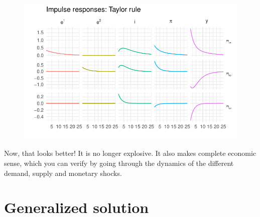 \documentclass[
  letterpaper,
]{book}
\begin{document}
\begin{figure}[H]

{\centering \includegraphics{BK_files/figure-pdf/unnamed-chunk-13-1.pdf}

}

\end{figure}

Now, that looks better! It is no longer explosive. It also makes
complete economic sense, which you can verify by going through the
dynamics of the different demand, supply and monetary shocks.

\hypertarget{generalized-solution}{%
\section{Generalized solution}\label{generalized-solution}}
\end{document}

